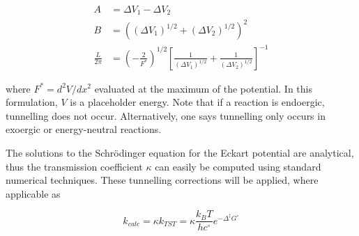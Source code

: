 \begin{doublespace}
\begin{align}
  A &= \Delta V_1 - \Delta V_2 \\
  B &= ((\Delta V_1)^{1/2} + (\Delta V_2)^{1/2})^2 \\
 \frac{L}{2\pi} &= (-\frac{2}{F^*})^{1/2} [\frac{1}{(\Delta V_1)^{1/2}} +
      \frac{1}{(\Delta V_2)^{1/2}}]^{-1}
\end{align}

\noindent where $F^* = d^2V/dx^2$ evaluated at the maximum of the potential. In
this formulation, $V$ is a placeholder energy. Note that if a reaction is
endoergic, tunnelling does not occur. Alternatively, one says tunnelling only
occurs in exoergic or energy-neutral reactions.

The solutions to the Schr{\"o}dinger equation for the Eckart potential are
analytical, thus the transmission coefficient $\kappa$ can easily be computed
using standard numerical techniques. These tunnelling corrections will be
applied, where applicable as

\begin{equation}
  k_{calc} = \kappa k_{TST} = \kappa
\frac{k_B T}{hc^\circ}e^{-\Delta^\ddagger G^\circ}
\end{equation}

\end{doublespace}
